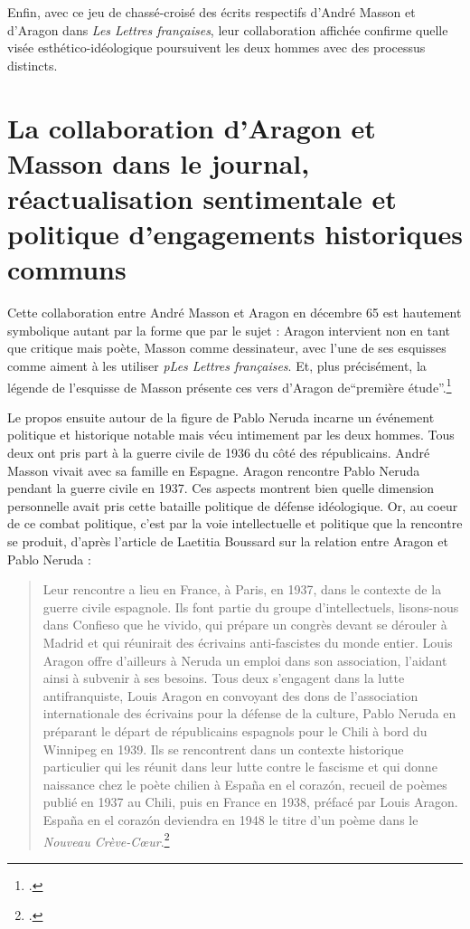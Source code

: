 	Enfin, avec ce jeu de chassé-croisé des écrits respectifs d’André Masson et d’Aragon dans \emph{Les Lettres françaises}, leur collaboration affichée confirme quelle visée esthético-idéologique poursuivent les deux hommes avec des processus distincts.

\section{La collaboration d’Aragon et Masson dans le journal, réactualisation sentimentale et politique d’engagements historiques communs}

Cette collaboration entre André Masson et Aragon en décembre 65 est hautement symbolique autant par la forme que par le sujet : Aragon intervient non en tant que critique mais poète, Masson comme dessinateur, avec l’une de ses esquisses comme aiment à les utiliser \emph{pLes Lettres françaises}. Et, plus précisément, la légende de l’esquisse de Masson présente ces vers d’Aragon de\enquote{première étude}.\footcite{pabloneruda}

	 Le propos ensuite autour de la figure de Pablo Neruda incarne un événement politique et historique notable mais vécu intimement par les deux hommes. Tous deux ont pris part à la guerre civile de 1936 du côté des républicains. André Masson vivait avec sa famille en Espagne. Aragon rencontre Pablo Neruda pendant la guerre civile en 1937. Ces aspects montrent bien quelle dimension personnelle avait pris cette bataille politique de défense idéologique. Or, au coeur de ce combat politique, c’est par la voie intellectuelle et politique que la rencontre se produit, d’après l’article de Laetitia Boussard sur la relation entre Aragon et Pablo Neruda :


\begin{quote}
Leur rencontre a lieu en France, à Paris, en 1937, dans le contexte de la guerre civile espagnole. Ils font partie du groupe d’intellectuels, lisons-nous dans Confieso que he vivido, qui prépare un congrès devant se dérouler à Madrid et qui réunirait des écrivains anti-fascistes du monde entier. Louis Aragon offre d’ailleurs à Neruda un emploi dans son association, l’aidant ainsi à subvenir à ses besoins. Tous deux s’engagent dans la lutte antifranquiste, Louis Aragon en convoyant des dons de l’association internationale des écrivains pour la défense de la culture, Pablo Neruda en préparant le départ de républicains espagnols pour le Chili à bord du Winnipeg en 1939. Ils se rencontrent dans un contexte historique particulier qui les réunit dans leur lutte contre le fascisme et qui donne naissance chez le poète chilien à España en el corazón, recueil de poèmes publié en 1937 au Chili, puis en France en 1938, préfacé par Louis Aragon. España en el corazón deviendra en 1948 le titre d’un poème dans le \emph{Nouveau Crève-Cœur}.\footcite{aragonaneruda}\end{quote}	 

